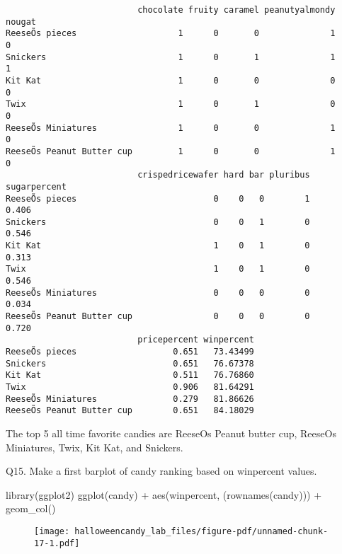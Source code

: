 \documentclass[
  letterpaper,
  DIV=11,
  numbers=noendperiod]{scrartcl}
\newenvironment{Shaded}{\begin{snugshade}}{\end{snugshade}}
\newcommand{\FunctionTok}[1]{\textcolor[rgb]{0.28,0.35,0.67}{#1}}
\newcommand{\NormalTok}[1]{\textcolor[rgb]{0.00,0.23,0.31}{#1}}
\newcommand{\SpecialCharTok}[1]{\textcolor[rgb]{0.37,0.37,0.37}{#1}}
\begin{document}
\begin{verbatim}
                          chocolate fruity caramel peanutyalmondy nougat
ReeseÕs pieces                    1      0       0              1      0
Snickers                          1      0       1              1      1
Kit Kat                           1      0       0              0      0
Twix                              1      0       1              0      0
ReeseÕs Miniatures                1      0       0              1      0
ReeseÕs Peanut Butter cup         1      0       0              1      0
                          crispedricewafer hard bar pluribus sugarpercent
ReeseÕs pieces                           0    0   0        1        0.406
Snickers                                 0    0   1        0        0.546
Kit Kat                                  1    0   1        0        0.313
Twix                                     1    0   1        0        0.546
ReeseÕs Miniatures                       0    0   0        0        0.034
ReeseÕs Peanut Butter cup                0    0   0        0        0.720
                          pricepercent winpercent
ReeseÕs pieces                   0.651   73.43499
Snickers                         0.651   76.67378
Kit Kat                          0.511   76.76860
Twix                             0.906   81.64291
ReeseÕs Miniatures               0.279   81.86626
ReeseÕs Peanut Butter cup        0.651   84.18029
\end{verbatim}

The top 5 all time favorite candies are ReeseOs Peanut butter cup,
ReeseOs Miniatures, Twix, Kit Kat, and Snickers.

Q15. Make a first barplot of candy ranking based on winpercent values.

\begin{Shaded}
\begin{Highlighting}[]
\FunctionTok{library}\NormalTok{(ggplot2)}
\FunctionTok{ggplot}\NormalTok{(candy) }\SpecialCharTok{+} 
  \FunctionTok{aes}\NormalTok{(winpercent, (}\FunctionTok{rownames}\NormalTok{(candy))) }\SpecialCharTok{+} \FunctionTok{geom\_col}\NormalTok{()}
\end{Highlighting}
\end{Shaded}

\begin{figure}[H]

{\centering \texttt{[image: halloweencandy\_lab\_files/figure-pdf/unnamed-chunk-17-1.pdf]}

}

\end{figure}
\end{document}

